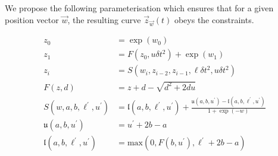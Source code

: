 \documentclass[]{article}
\begin{document}
				We propose the following parameterisation which ensures that for a given position vector $\vec{w}$, the resulting curve $\vec{z}_{\vec{w}}(t)$ obeys the constraints.

				\begin{align}
					z_0 & = \exp(w_0)
					\\
					z_1 & = F(z_0,u \delta t^2) + \exp(w_1)
					\\
					z_i & = S(w_i,z_{i-2},z_{i-1},\ell\delta t^2,u\delta t^2) 
					\\
					F(z,d) & = z + d - \sqrt{d^2 + 2 d u}
					\\
					S(w,a,b,\ell^\prime,u^\prime) & = \mathfrak{l}(a,b,\ell^\prime,u^\prime) + \frac{\mathfrak{u}(a,b,u^\prime) - \mathfrak{l}(a,b,\ell^\prime,u^\prime)}{1 + \exp(-w)} 
					\\
					\mathfrak{u}(a,b,u^\prime) & = u^\prime + 2 b - a
					\\
					\mathfrak{l}(a,b,\ell^\prime,u^\prime) & = \text{max}\left(0,F(b,u^\prime), \ell^\prime + 2 b - a \right)
				\end{align}
\end{document}

